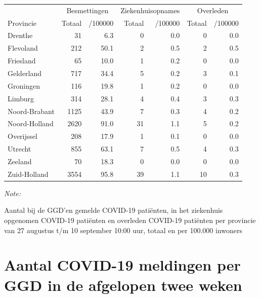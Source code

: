 \documentclass[
  english,
  man,floatsintext]{apa6}
\begin{document}
\begin{table}[H]
\centering
\begin{threeparttable}
\begin{tabular}{lrrrrrr}
\toprule
\multicolumn{1}{c}{ } & \multicolumn{2}{c}{Besmettingen} & \multicolumn{2}{c}{Ziekenhuisopnames} & \multicolumn{2}{c}{Overleden} \\
\cmidrule(l{3pt}r{3pt}){2-3} \cmidrule(l{3pt}r{3pt}){4-5} \cmidrule(l{3pt}r{3pt}){6-7}
Provincie & Totaal & /100000 & Totaal & /100000 & Totaal & /100000\\
\midrule
Drenthe & 31 & 6.3 & 0 & 0.0 & 0 & 0.0\\
Flevoland & 212 & 50.1 & 2 & 0.5 & 2 & 0.5\\
Friesland & 65 & 10.0 & 1 & 0.2 & 0 & 0.0\\
Gelderland & 717 & 34.4 & 5 & 0.2 & 3 & 0.1\\
Groningen & 116 & 19.8 & 1 & 0.2 & 0 & 0.0\\
Limburg & 314 & 28.1 & 4 & 0.4 & 3 & 0.3\\
Noord-Brabant & 1125 & 43.9 & 7 & 0.3 & 4 & 0.2\\
Noord-Holland & 2620 & 91.0 & 31 & 1.1 & 5 & 0.2\\
Overijssel & 208 & 17.9 & 1 & 0.1 & 0 & 0.0\\
Utrecht & 855 & 63.1 & 7 & 0.5 & 4 & 0.3\\
Zeeland & 70 & 18.3 & 0 & 0.0 & 0 & 0.0\\
Zuid-Holland & 3554 & 95.8 & 39 & 1.1 & 10 & 0.3\\
\bottomrule
\end{tabular}
\begin{tablenotes}
\item \textit{Note: } 
\item Aantal bij de GGD’en gemelde COVID-19 patiënten, in het ziekenhuis opgenomen COVID-19 patiënten en overleden COVID-19 patiënten per provincie van 27 augustus t/m 10 september 10:00 uur, totaal en per 100.000 inwoners
\end{tablenotes}
\end{threeparttable}
\end{table}

\newpage

\hypertarget{aantal-covid-19-meldingen-per-ggd-in-de-afgelopen-twee-weken}{%
\section{Aantal COVID-19 meldingen per GGD in de afgelopen twee weken}\label{aantal-covid-19-meldingen-per-ggd-in-de-afgelopen-twee-weken}}
\end{document}
